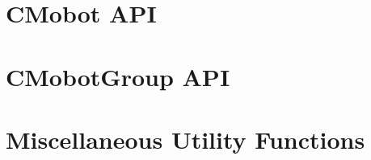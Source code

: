 \documentclass{article}
\begin{document}
\section{\label{sec:cmobot_api}CMobot API}


\section{\label{sec:cmobotgroup_api}CMobotGroup API}


\section{\label{sec:utility_functions}Miscellaneous Utility Functions}

\printindex
\end{document}
